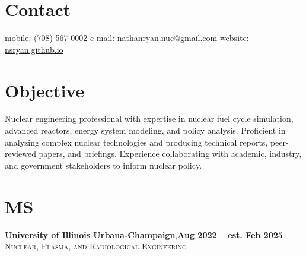 \documentclass[margin,line]{resume}
\begin{document}
\begin{resume}

%


    \section{\mysidestyle Contact}
    mobile: (708) 567-0002 \hfill e-mail: \href{mailto:nathanryan.nuc@gmail.com}{nathanryan.nuc@gmail.com} \hfill website: \href{https://nsryan.github.io}{nsryan.github.io} \vspace{0mm}\\\vspace{1mm}%

    \vspace{-6mm}
    \section{\mysidestyle Objective}
    Nuclear engineering professional with expertise in nuclear fuel cycle simulation, advanced reactors, energy system modeling, and policy analysis. Proficient in analyzing complex nuclear technologies and producing technical reports, peer-reviewed papers, and briefings. Experience collaborating with academic, industry, and government stakeholders to inform nuclear policy.

    \section{\mysidestyle MS}
    \textbf{University of Illinois Urbana-Champaign},\hfill\textbf{Aug 2022 -- est. Feb 2025}\\
    \textsc{Nuclear, Plasma, and Radiological Engineering}\\
    \vspace{-3.5mm}

\end{resume}
\end{document}
